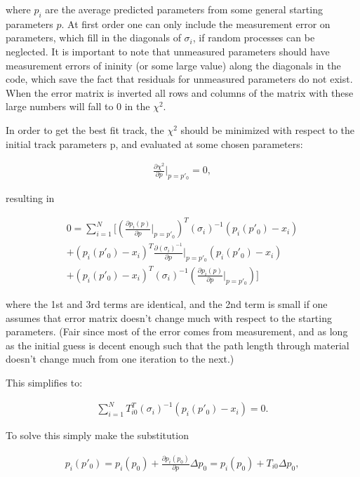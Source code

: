 \documentclass{article}
\begin{document}
where $p_{i}$ are the average predicted parameters from some general starting parameters $p$. At first order one can only include the measurement error on parameters, which fill in the diagonals of $\sigma_{i}$, if random processes can be neglected. It is important to note that unmeasured parameters should have measurement errors of ininity (or some large value) along the diagonals in the code, which save the fact that residuals for unmeasured parameters do not exist. When the error matrix is inverted all rows and columns of the matrix with these large numbers will fall to 0 in the $\chi^{2}$. 

In order to get the best fit track, the $\chi^{2}$ should be minimized with respect to the initial track parameters p, and evaluated at some chosen parameters:

\begin{align} \label{eq:minimize}
\frac{\partial \chi^{2}}{\partial p}|_{p=p'_{0}} = 0,
\end{align}

resulting in

\begin{align}
0 = \sum_{i=1}^{N}[ (\frac{\partial p_{i}(p)}{\partial p}|_{p=p'_{0}})^{T} (\sigma_{i})^{-1} (p_{i}(p'_{0})-x_{i}) \\ 
+ (p_{i}(p'_{0})-x_{i})^{T} \frac{\partial(\sigma_{i})^{-1}}{\partial p}|_{p=p'_{0}} (p_{i}(p'_{0})-x_{i}) \\ 
+  (p_{i}(p'_{0})-x_{i})^{T} (\sigma_{i})^{-1} (\frac{\partial p_{i}(p)}{\partial p}|_{p=p'_{0}})]
\end{align}

where the 1st and 3rd terms are identical, and the 2nd term is small if one assumes that error matrix doesn't change much with respect to the starting parameters. (Fair since most of the error comes from measurement, and as long as the initial guess is decent enough such that the path length through material doesn't change much from one iteration to the next.)

This simplifies to: 

\begin{align} \label{eq:solve}
\sum_{i=1}^{N} T^{T}_{i0}(\sigma_{i})^{-1}(p_{i}(p'_{0})-x_{i}) = 0.
\end{align}

To solve this simply make the substitution 

\begin{align} \label{eq:psub}
p_{i}(p'_{0}) = p_{i}(p_{0}) + \frac{\partial p_{i}(p_{0})}{\partial p} \Delta p_{0} = p_{i}(p_{0}) + T_{i0} \Delta p_{0},
\end{align}
\end{document}
